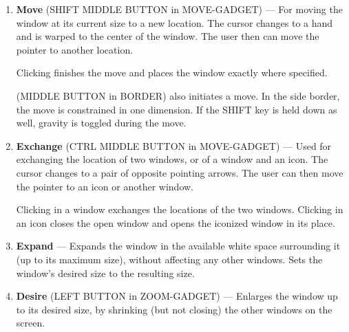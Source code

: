 \begin{enumerate}
The cursor changes to a dotted box and is warped to the center of the
window.  The user then can move the pointer to another location.

Double clicking will relocate the window with its center at (or near) the
pointer.

However, just pressing (or single clicking) changes the cursor again, to
an ``anchored arrow'' signifying that the user is to size the window.
The current pointer location becomes the top left corner of the window.
The user can then move the pointer to specify the bottom right corner.

Releasing (or clicking again) finishes the sizing and relocates the
window at or near the size and position specified.  The
window's desired size is set to the size indicated by the user unless the
CTRL button is depressed.


\item 
{\bf Move} ({\sc SHIFT MIDDLE BUTTON in MOVE-GADGET}) --- For moving the
window at its current size to a new location.  The cursor changes to a
hand and is warped to the center of the window.  The user then can move
the pointer to another location.

Clicking finishes the move and places the window exactly where specified.

({\sc MIDDLE BUTTON in BORDER}) also initiates a move.  In the side border,
the move is constrained in one dimension.  If the {\sc SHIFT} key is held
down as well, gravity is toggled during the move.


\item 
{\bf Exchange} ({\sc CTRL MIDDLE BUTTON in MOVE-GADGET}) --- Used for
exchanging the location of two windows, or of a window and an icon.  The
cursor changes to a pair of opposite pointing arrows.  The user can then
move the pointer to an icon or another window.

Clicking in a window exchanges the locations of the two windows.
Clicking in an icon closes the open window and opens the iconized
window in its place.


\item {\bf Expand} --- Expands the window in the available white space
surrounding it (up to its maximum size), without affecting any other
windows.  Sets the window's desired size to the resulting size.

\item {\bf Desire} ({\sc LEFT BUTTON in ZOOM-GADGET}) --- Enlarges the window
up to its desired size, by shrinking (but not closing) the other windows
on the screen.


\end{enumerate}
